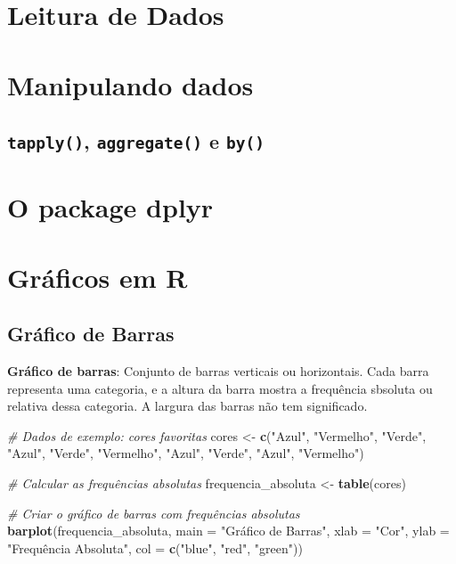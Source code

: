 \documentclass[
]{book}
\newenvironment{Shaded}{\begin{snugshade}}{\end{snugshade}}
\newcommand{\AttributeTok}[1]{\textcolor[rgb]{0.13,0.29,0.53}{#1}}
\newcommand{\CommentTok}[1]{\textcolor[rgb]{0.56,0.35,0.01}{\textit{#1}}}
\newcommand{\FunctionTok}[1]{\textcolor[rgb]{0.13,0.29,0.53}{\textbf{#1}}}
\newcommand{\NormalTok}[1]{#1}
\newcommand{\OtherTok}[1]{\textcolor[rgb]{0.56,0.35,0.01}{#1}}
\newcommand{\StringTok}[1]{\textcolor[rgb]{0.31,0.60,0.02}{#1}}
\theoremstyle{definition}
\theoremstyle{definition}
\theoremstyle{definition}
\theoremstyle{definition}
\theoremstyle{remark}
\begin{document}
\chapter{Leitura de Dados}\label{leitura-de-dados}

\chapter{Manipulando dados}\label{manipulando-dados}

\section{\texorpdfstring{\texttt{tapply()}, \texttt{aggregate()} e \texttt{by()}}{tapply(), aggregate() e by()}}\label{tapply-aggregate-e-by}

\chapter{O package dplyr}\label{o-package-dplyr}

\chapter{Gráficos em R}\label{gruxe1ficos-em-r}

\section{Gráfico de Barras}\label{gruxe1fico-de-barras}

\textbf{Gráfico de barras}: Conjunto de barras verticais ou horizontais. Cada barra representa uma categoria, e a altura da barra mostra a frequência sbsoluta ou relativa dessa categoria. A largura das barras não tem significado.

\begin{Shaded}
\begin{Highlighting}[]
\CommentTok{\# Dados de exemplo: cores favoritas}
\NormalTok{cores }\OtherTok{\textless{}{-}} \FunctionTok{c}\NormalTok{(}\StringTok{"Azul"}\NormalTok{, }\StringTok{"Vermelho"}\NormalTok{, }\StringTok{"Verde"}\NormalTok{, }\StringTok{"Azul"}\NormalTok{, }\StringTok{"Verde"}\NormalTok{, }
\StringTok{"Vermelho"}\NormalTok{, }\StringTok{"Azul"}\NormalTok{, }\StringTok{"Verde"}\NormalTok{, }\StringTok{"Azul"}\NormalTok{, }\StringTok{"Vermelho"}\NormalTok{)}

\CommentTok{\# Calcular as frequências absolutas}
\NormalTok{frequencia\_absoluta }\OtherTok{\textless{}{-}} \FunctionTok{table}\NormalTok{(cores)}

\CommentTok{\# Criar o gráfico de barras com frequências absolutas}
\FunctionTok{barplot}\NormalTok{(frequencia\_absoluta,}
  \AttributeTok{main =} \StringTok{"Gráfico de Barras"}\NormalTok{,         }
  \AttributeTok{xlab =} \StringTok{"Cor"}\NormalTok{,         }
  \AttributeTok{ylab =} \StringTok{"Frequência Absoluta"}\NormalTok{,         }
  \AttributeTok{col =} \FunctionTok{c}\NormalTok{(}\StringTok{"blue"}\NormalTok{, }\StringTok{"red"}\NormalTok{, }\StringTok{"green"}\NormalTok{)) }
\end{Highlighting}
\end{Shaded}
\end{document}
